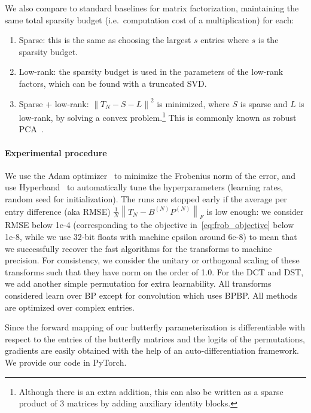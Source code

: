 We also compare to standard baselines for matrix factorization, maintaining the same total sparsity budget (i.e.\ computation cost of a multiplication) for each:

\begin{enumerate}[topsep=0pt, itemsep=-1ex, partopsep=1ex, parsep=1ex]
  \item Sparse: this is the same as choosing the largest $s$ entries where $s$ is the sparsity budget.
  \item Low-rank: the sparsity budget is used in the parameters of the low-rank factors, which can be found with a truncated SVD.
  \item Sparse + low-rank: $\left\| T_N - S - L \right\|^2$ is minimized, where $S$ is sparse and $L$ is low-rank, by solving a convex problem.\footnote{Although there is an extra addition, this can also be written as a sparse product of 3 matrices by adding auxiliary identity blocks.} This is commonly known as robust PCA~\citep{candes2011robust}.
\end{enumerate}

\paragraph{Experimental procedure} We use the Adam optimizer~\citep{Kingma2014} to minimize the Frobenius norm of the error, and use Hyperband~\citep{li2017hyperband} to automatically tune the hyperparameters (learning rates, random seed for initialization). The runs are stopped early if the average per entry difference (aka RMSE)
$\frac{1}{N} \left\| T_N - B^{(N)} P^{(N)}  \right\|_F$ is low enough: we consider RMSE below 1e-4 (corresponding to the objective
in~\eqref{eq:frob_objective} below 1e-8, while we use 32-bit floats with machine epsilon around 6e-8) to mean that we successfully recover the fast algorithms for the transforms to machine precision. For consistency, we consider the unitary or orthogonal scaling of these transforms such that they have norm on the order of 1.0. For the DCT and DST, we add another simple permutation for extra learnability. All transforms considered learn over BP except for convolution which uses BPBP. All methods are optimized over complex entries.

Since the forward mapping of our butterfly parameterization is differentiable with respect to the entries of the butterfly matrices and the logits of the permutations, gradients are easily obtained with the help of an auto-differentiation framework. We provide our code in PyTorch.

